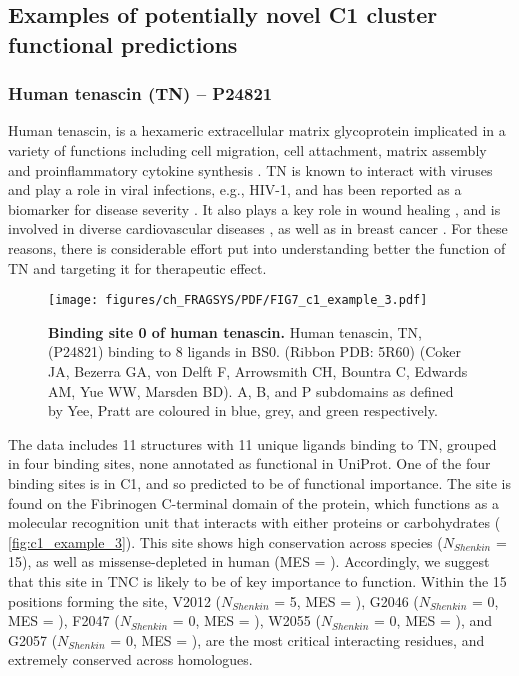 \subsection{Examples of potentially novel C1 cluster functional predictions}

\subsubsection{Human tenascin (TN) -- P24821}

Human tenascin, is a hexameric extracellular matrix glycoprotein implicated in a variety of functions including cell migration, cell attachment, matrix assembly and proinflammatory cytokine synthesis \cite{BHATTACHARYYA_2022_TNC}. TN is known to interact with viruses and play a role in viral infections, e.g., HIV-1, and has been reported as a biomarker for disease severity \cite{ZULIANI_2023_TNC}. It also plays a key role in wound healing \cite{WANG_2022_TNC}, and is involved in diverse cardiovascular diseases \cite{KHOMTCHOUK_2022_TNC}, as well as in breast cancer \cite{LEPUCKI_2022_TNC}. For these reasons, there is considerable effort put into understanding better the function of TN and targeting it for therapeutic effect.

\begin{figure}[htb!]
    \centering
    \texttt{[image: figures/ch\_FRAGSYS/PDF/FIG7\_c1\_example\_3.pdf]}
    \caption[Binding site 0 of human tenascin]{\textbf{Binding site 0 of human tenascin.} Human tenascin, TN, (P24821) binding to 8 ligands in BS0. (Ribbon PDB: 5R60) (Coker JA, Bezerra GA, von Delft F, Arrowsmith CH, Bountra C, Edwards AM, Yue WW, Marsden BD). A, B, and P subdomains as defined by Yee, Pratt \cite{YEE_1997_FIBRINOGEN} are coloured in blue, grey, and green respectively.}
    \label{fig:c1_example_3}
\end{figure}

The data includes 11 structures with 11 unique ligands binding to TN, grouped in four binding sites, none annotated as functional in UniProt. One of the four binding sites is in C1, and so predicted to be of functional importance. The site is found on the Fibrinogen C-terminal domain of the protein, which functions as a molecular recognition unit that interacts with either proteins or carbohydrates ( \autoref{fig:c1_example_3}). This site shows high conservation across species ($N_{Shenkin}$ = 15), as well as missense-depleted in human (MES = ). Accordingly, we suggest that this site in TNC is likely to be of key importance to function. Within the 15 positions forming the site, V2012 ($N_{Shenkin}$ = 5, MES = ), G2046 ($N_{Shenkin}$ = 0, MES = ), F2047 ($N_{Shenkin}$ = 0, MES = ), W2055 ($N_{Shenkin}$ = 0, MES = ), and G2057 ($N_{Shenkin}$ = 0, MES = ), are the most critical interacting residues, and extremely conserved across homologues.

